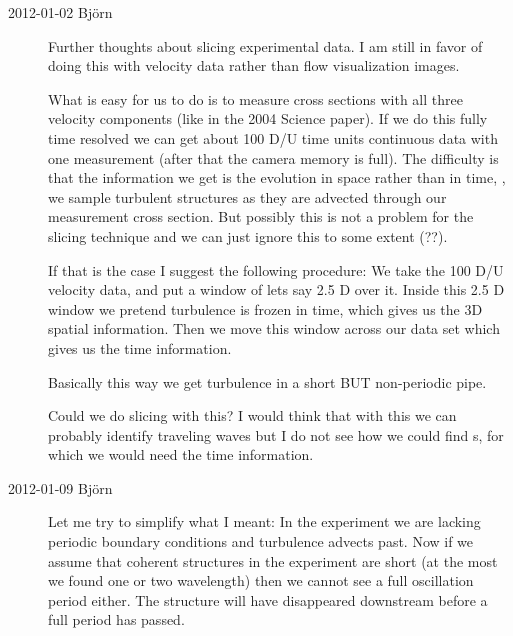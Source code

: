\begin{description}
\item[2012-01-02 Bj\"orn]
Further thoughts about slicing experimental data. I am still in favor of
doing this with velocity data rather than flow visualization images.

What is easy for us to do is to measure cross sections with all three
velocity components (like in the 2004 Science paper). If we do this fully
time resolved we can get about 100 D/U time units continuous data with
one measurement (after that the camera memory is full). The
difficulty is that the information we get is the evolution in space
rather than in time, \ie, we sample turbulent structures as they
are advected through our measurement cross section. But possibly this is
not a problem for the slicing technique and we can just ignore this to
some extent (??).

If that is the case I suggest the following procedure: We take the 100 D/U
velocity data, and put a window of lets say 2.5 D over it. Inside this
2.5 D window we pretend turbulence is frozen in time, which gives us the
3D spatial information. Then we move this window across our data set
which gives us the time information.

Basically this way we get turbulence in a short BUT non-periodic pipe.

Could we do slicing with this? I would think that with this we can
probably identify traveling waves but I do not see how we could find
\rpo s, for which we would need the time information.

\item[2012-01-09 Bj\"orn]
Let me try to simplify what I meant: In the experiment we are lacking
periodic boundary conditions and turbulence advects past. Now if we
assume that coherent structures in the experiment are short (at  the
most we found one or two wavelength) then we cannot see a full
oscillation period either. The structure will have disappeared downstream
before a full period has passed.

\end{description}
